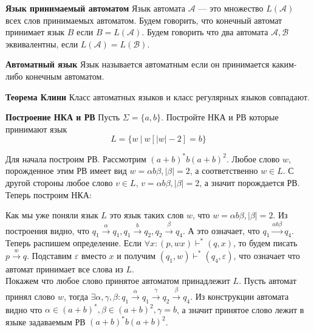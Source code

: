 \textbf{Язык принимаемый автоматом}
Язык автомата $\mathcal{A}$ --- это множество $L(\mathcal{A})$ всех слов принимаемых автоматом. Будем говорить, что конечный автомат принимает язык $B$ если $B = L(\mathcal{
        A})$. Будем говорить что два автомата $\mathcal{A}, \mathcal{B}$ эквивалентны, если $L(\mathcal{A})=L(\mathcal{B})$.

\textbf{Автоматный язык}
Язык называется автоматным если он принимается каким-либо конечным автоматом.

\textbf{Теорема Клини}
Класс автоматных языков и класс регулярных языков совпадают.

\textbf{Построение НКА и РВ}
Пусть $\Sigma = \{a, b\}$. Постройте НКА и РВ которые принимают язык $$ L = \{w\ | \ w[|w|-2]=b\} $$

Для начала построим РВ. Рассмотрим $(a+b)^*b(a+b)^2$. Любое слово $w$, порожденное этим РВ имеет вид $w = \alpha b \beta, |\beta| = 2$, а соответственно $w \in L$. С другой стороны любое слово $v \in L$, $v = \alpha b \beta, |\beta| = 2$, а значит порождается РВ.\\
Теперь построим НКА:
\begin{center}
\end{center}
Как мы уже поняли язык $L$ это язык таких слов $w$, что $w = \alpha b \beta, |\beta| = 2$. Из построения видно, что $q_1 \xrightarrow{\alpha} q_1, q_1 \xrightarrow{b} q_2, q_2 \xrightarrow{\beta} q_4$. А это означает, что $q_1 \xrightarrow{\alpha b \beta} q_4$.
Теперь распишем определение.
Если $\forall x: (p, wx) \vdash^* (q, x)$, то будем писать $p \xrightarrow{w} q$.
Подставим $\varepsilon$ вместо $x$ и получим
$(q_1, w) \vdash^* (q_4, \varepsilon)$, что означает что автомат принимает все слова из $L$. \\
Покажем что любое слово принятое автоматом принадлежит $L$. Пусть автомат принял слово $w$, тогда $\exists \alpha, \gamma, \beta: q_1 \xrightarrow{\alpha} q_1 \xrightarrow{\gamma} q_2 \xrightarrow{\beta} q_4$. Из конструкции автомата видно что $\alpha \in (a+b)^*, \beta \in  (a+b)^2, \gamma = b$, а значит принятое слово лежит в языке задаваемым РВ $(a+b)^*b(a+b)^2$.

